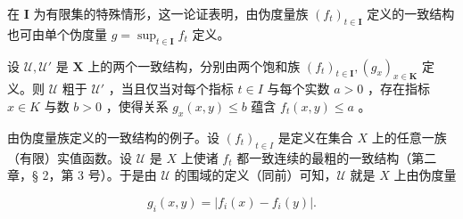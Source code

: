 在 \(\mathbf{I}\) 为有限集的特殊情形，这一论证表明，由伪度量族 \((f_{t})_{t\in \mathbf{I}}\) 定义的一致结构也可由单个伪度量 \(g = \sup_{t\in \mathbf{I}}f_t\) 定义。

设 \(\mathcal{U},\mathcal{U}'\) 是 \(\mathbf{X}\) 上的两个一致结构，分别由两个饱和族 \((f_{t})_{t\in \mathbf{I}},(g_{x})_{x\in \mathbf{K}}\) 定义。则 \(\mathcal{U}\) 粗于 \(\mathcal{U}'\) ，当且仅当对每个指标 \(t\in I\) 与每个实数 \(a > 0\) ，存在指标 \(x\in K\) 与数 \(b > 0\) ，使得关系 \(g_{x}(x,y)\leqslant b\) 蕴含 \(f_{t}(x,y)\leqslant a\) 。

由伪度量族定义的一致结构的例子。设 \((f_{t})_{t\in I}\) 是定义在集合 \(X\) 上的任意一族（有限）实值函数。设 \(\mathcal{U}\) 是 \(X\) 上使诸 \(f_{t}\) 都一致连续的最粗的一致结构（第二章，§ 2，第 3 号）。于是由 \(\mathcal{U}\) 的围域的定义（同前）可知，\(\mathcal{U}\) 就是 \(X\) 上由伪度量

\[
g _ {i} (x, y) = | f _ {i} (x) - f _ {i} (y) |.
\]

